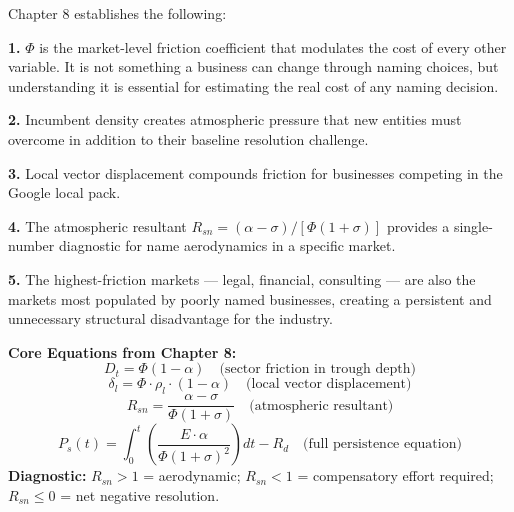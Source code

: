 \documentclass[12pt, openany]{book}
\theoremstyle{thmstyle}
\theoremstyle{defstyle}
\begin{document}
Chapter 8 establishes the following:

\textbf{1.} $\Phi$ is the market-level friction coefficient that modulates the cost of every other variable. It is not something a business can change through naming choices, but understanding it is essential for estimating the real cost of any naming decision.

\textbf{2.} Incumbent density creates atmospheric pressure that new entities must overcome in addition to their baseline resolution challenge.

\textbf{3.} Local vector displacement compounds friction for businesses competing in the Google local pack.

\textbf{4.} The atmospheric resultant $R_{sn} = (\alpha - \sigma)/[\Phi(1+\sigma)]$ provides a single-number diagnostic for name aerodynamics in a specific market.

\textbf{5.} The highest-friction markets --- legal, financial, consulting --- are also the markets most populated by poorly named businesses, creating a persistent and unnecessary structural disadvantage for the industry.

\begin{equationbox}
\textbf{Core Equations from Chapter 8:}
\[
D_t = \Phi(1 - \alpha) \quad \text{(sector friction in trough depth)}
\]
\[
\delta_l = \Phi \cdot \rho_l \cdot (1 - \alpha) \quad \text{(local vector displacement)}
\]
\[
R_{sn} = \frac{\alpha - \sigma}{\Phi(1+\sigma)} \quad \text{(atmospheric resultant)}
\]
\[
P_s(t) = \int_0^t \left(\frac{E \cdot \alpha}{\Phi(1+\sigma)^2}\right) dt - R_d \quad \text{(full persistence equation)}
\]
\textbf{Diagnostic:} $R_{sn} > 1$ = aerodynamic; $R_{sn} < 1$ = compensatory effort required; $R_{sn} \leq 0$ = net negative resolution.
\end{equationbox}
\end{document}
